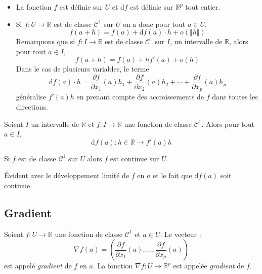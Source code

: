 \documentclass[french,11pt,twoside]{VcCours}
\begin{document}
\begin{Remarques}{}
\begin{itemize}
\item La fonction $f$ est définie sur $U$ et $\textrm{d}f$ est définie sur $\mathbb{R}^p$ tout entier.
\item Si $f : U \rightarrow \mathbb{R}$ est de classe $\mathcal{C}^1$ sur $U$ on a donc pour tout $a \in U$,
$$ f(a+h)=f(a) + \textrm{d}f(a) \cdot h + o (\Vert h \Vert)$$
Remarquons que si $f : I \rightarrow\mathbb{R}$ est de classe $\mathcal{C}^1$ sur $I$, un intervalle de $\mathbb{R}$, alors pour tout $a \in I$,
$$ f(a+h)=f(a) + h f'(a) + o(h)$$
Dans le cas de plusieurs variables, le terme 
$$   \textrm{d}f(a) \cdot h = \dfrac{\partial f}{\partial x_1}(a) h_1 + \dfrac{\partial f}{\partial x_2}(a) h_2 + \cdots + \dfrac{\partial f}{\partial x_p}(a) h_p$$
généralise $f'(a)h$ en prenant compte des accroissements de $f$ dans toutes les directions.
\end{itemize}
\end{Remarques}

\begin{Corollaire}{} Soient $I$ un intervalle de $\mathbb{R}$ et $f : I \rightarrow \mathbb{R}$ une fonction de classe $\mathcal{C}^1$. Alors pour tout $a \in I$, 
$$\textrm{d}f(a) : h \in \mathbb{R} \rightarrow f'(a)h$$
\end{Corollaire}

\begin{Proposition}{} Si $f$ est de classe $\mathcal{C}^1$ sur $U$ alors $f$ est continue sur $U$.
\end{Proposition}

\begin{Demonstration}{} Évident avec le développement limité de $f$ en $a$ et le fait que $\textrm{d}f(a)$ soit continue.
\end{Demonstration}

\subsection{Gradient}

\begin{Definition}{} Soient $f : U \rightarrow \mathbb{R}$ une fonction de classe $\mathcal{C}^1$ et $a \in U$. Le vecteur :
$$ \nabla f(a) = \left(\dfrac{\partial f}{\partial x_1}(a), \ldots,   \dfrac{\partial f}{\partial x_p}(a) \right) $$
est appelé \emph{gradient} de $f$ en $a$. La fonction $\nabla f : U \rightarrow \mathbb{R}^p$ est appelée \emph{gradient} de $f$.
\end{Definition}
\end{document}
